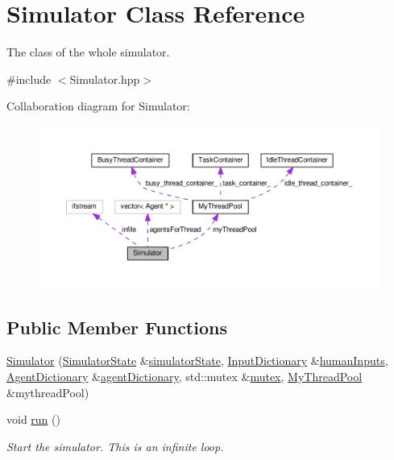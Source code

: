 \hypertarget{classSimulator}{}\section{Simulator Class Reference}
\label{classSimulator}


The class of the whole simulator.  




{\ttfamily \#include $<$Simulator.\+hpp$>$}



Collaboration diagram for Simulator\+:\nopagebreak
\begin{figure}[H]
\begin{center}
\leavevmode
\includegraphics[width=350pt]{classSimulator__coll__graph}
\end{center}
\end{figure}
\subsection*{Public Member Functions}
\begin{DoxyCompactItemize}
\item 
\hyperlink{classSimulator_a9f689d6fe7cabbc4a31da6a3202a2428}{Simulator} (\hyperlink{main_8hpp_a4cb9f4bcd812094244f1949a88671bb8}{Simulator\+State} \&\hyperlink{classSimulator_adac2342fdb4ea403867b50df76a8d0c7}{simulator\+State}, \hyperlink{Server_8hpp_a49cc8333bde52a7f1eb36bdb3e4e8a06}{Input\+Dictionary} \&\hyperlink{classSimulator_a5d1671432b317ac4ddb63acb0267388b}{human\+Inputs}, \hyperlink{Server_8hpp_acc6d6e73aa06631da7c2f627f9979d64}{Agent\+Dictionary} \&\hyperlink{classSimulator_adc23128e4d69f004ce27410cb505bd2a}{agent\+Dictionary}, std\+::mutex \&\hyperlink{classSimulator_a7292c6375fc98bac2acd5b183aab36fb}{mutex}, \hyperlink{classMyThreadPool}{My\+Thread\+Pool} \&mythread\+Pool)
\item 
void \hyperlink{classSimulator_aa2de7e32b04cc3e8fc60aec23997621b}{run} ()
\begin{DoxyCompactList}\small\item\em Start the simulator. This is an infinite loop. \end{DoxyCompactList}\end{DoxyCompactItemize}
